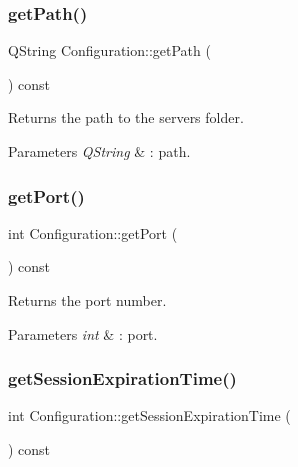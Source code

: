 \subsubsection{\texorpdfstring{get\+Path()}{getPath()}}
{\footnotesize\ttfamily Q\+String Configuration\+::get\+Path (\begin{DoxyParamCaption}{ }\end{DoxyParamCaption}) const\hspace{0.3cm}{\ttfamily [inline]}}



Returns the path to the server\textquotesingle{}s folder. 


\begin{DoxyParams}{Parameters}
{\em Q\+String} & \+: path. \\
\hline
\end{DoxyParams}
\mbox{\label{class_configuration_ab34eb25aa1e175c7ac8323300b298a8a}} 
\subsubsection{\texorpdfstring{get\+Port()}{getPort()}}
{\footnotesize\ttfamily int Configuration\+::get\+Port (\begin{DoxyParamCaption}{ }\end{DoxyParamCaption}) const\hspace{0.3cm}{\ttfamily [inline]}}



Returns the port number. 


\begin{DoxyParams}{Parameters}
{\em int} & \+: port. \\
\hline
\end{DoxyParams}
\mbox{\label{class_configuration_af14b4f22fdcdfc32fbcac712a9868fd4}} 
\subsubsection{\texorpdfstring{get\+Session\+Expiration\+Time()}{getSessionExpirationTime()}}
{\footnotesize\ttfamily int Configuration\+::get\+Session\+Expiration\+Time (\begin{DoxyParamCaption}{ }\end{DoxyParamCaption}) const\hspace{0.3cm}{\ttfamily [inline]}}



